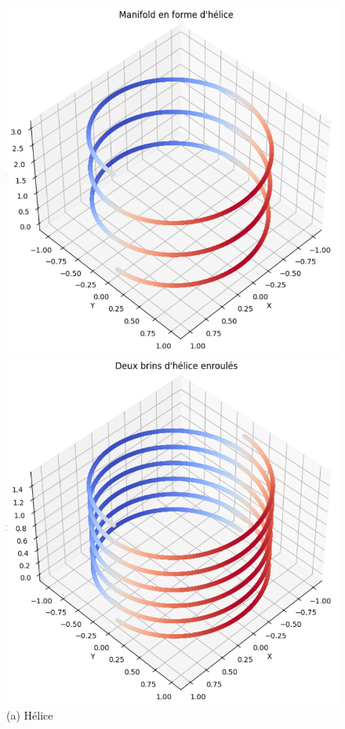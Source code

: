 \documentclass[unnumsec,webpdf,modern,large]{projet_manifold}%
\theoremstyle{thmstyleone}%
\theoremstyle{thmstyletwo}%
\theoremstyle{thmstylethree}%
\begin{document}
\begin{figure}[t]
    \centering
    \begin{minipage}{0.19\textwidth}
        \includegraphics[width=\linewidth]{Fig/helice.png}
        \caption*{(a) Hélice}
    \end{minipage}%
    \hfill
    \begin{minipage}{0.19\textwidth}
        \includegraphics[width=\linewidth]{Fig/adn.png}

\end{minipage}
\end{figure}
\end{document}
